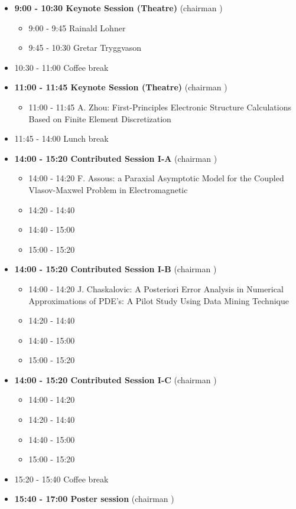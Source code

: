 \documentclass[10pt, A4]{article}%
\begin{document}
\begin{itemize}    
  \item {\bf 9:00 - 10:30 Keynote Session (Theatre)} (chairman ) 
  \begin{itemize}
    \item 9:00 - 9:45 Rainald Lohner
    \item 9:45 - 10:30 Gretar Tryggvason
  \end{itemize}
  \item 10:30 - 11:00 Coffee break
  \item {\bf 11:00 - 11:45 Keynote Session (Theatre)} (chairman ) 
  \begin{itemize}
    \item 11:00 - 11:45 {A. Zhou}: {First-Principles Electronic Structure Calculations Based on Finite Element Discretization}
  \end{itemize}
  \item 11:45 - 14:00 Lunch break      
  \item {\bf 14:00 - 15:20 Contributed Session I-A} (chairman ) 
  \begin{itemize}
    \item 14:00 - 14:20 {F. Assous}: {a Paraxial Asymptotic Model for the Coupled Vlasov-Maxwel Problem in Electromagnetic}
    \item 14:20 - 14:40 
    \item 14:40 - 15:00 
    \item 15:00 - 15:20 
  \end{itemize}
  \item {\bf 14:00 - 15:20 Contributed Session I-B} (chairman ) 
  \begin{itemize}
    \item 14:00 - 14:20 {J. Chaskalovic}: {A Posteriori Error Analysis in Numerical Approximations of PDE's: A Pilot Study Using Data Mining Technique}
    \item 14:20 - 14:40 
    \item 14:40 - 15:00 
    \item 15:00 - 15:20 
  \end{itemize}
    \item {\bf 14:00 - 15:20 Contributed Session I-C} (chairman ) 
  \begin{itemize}
    \item 14:00 - 14:20 
    \item 14:20 - 14:40 
    \item 14:40 - 15:00 
    \item 15:00 - 15:20 
  \end{itemize}
  \item 15:20 - 15:40 Coffee break
  \item {\bf 15:40 - 17:00 Poster session} (chairman )
\end{itemize}
\end{document}
